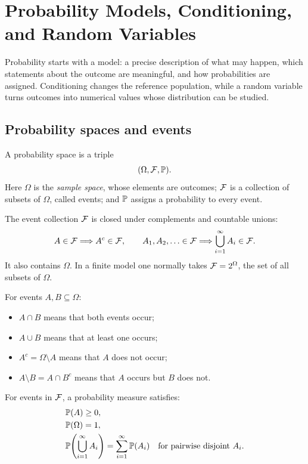 \chapter{Probability Models, Conditioning, and Random Variables}
\label{chap:probability-models}

Probability starts with a model: a precise description of what may happen,
which statements about the outcome are meaningful, and how probabilities are
assigned. Conditioning changes the reference population, while a random
variable turns outcomes into numerical values whose distribution can be
studied.

\section{Probability spaces and events}

\begin{definition}
A probability space is a triple
\[
  (\Omega,\mathcal{F},\mathbb{P}).
\]
Here \(\Omega\) is the \emph{sample space}, whose elements are outcomes;
\(\mathcal{F}\) is a collection of subsets of \(\Omega\), called events; and
\(\mathbb{P}\) assigns a probability to every event.
\end{definition}

The event collection \(\mathcal{F}\) is closed under complements and countable
unions:
\[
  A\in\mathcal{F} \Longrightarrow A^c\in\mathcal{F},
  \qquad
  A_1,A_2,\ldots\in\mathcal{F}
  \Longrightarrow \bigcup_{i=1}^{\infty}A_i\in\mathcal{F}.
\]
It also contains \(\Omega\). In a finite model one normally takes
\(\mathcal{F}=2^\Omega\), the set of all subsets of \(\Omega\).

For events \(A,B\subseteq\Omega\):
\begin{itemize}
  \item \(A\cap B\) means that both events occur;
  \item \(A\cup B\) means that at least one occurs;
  \item \(A^c=\Omega\setminus A\) means that \(A\) does not occur;
  \item \(A\setminus B=A\cap B^c\) means that \(A\) occurs but \(B\) does not.
\end{itemize}

\begin{definition}
For events in \(\mathcal{F}\), a probability measure satisfies:
\begin{align*}
  &\mathbb{P}(A)\ge 0,\\
  &\mathbb{P}(\Omega)=1,\\
  &\mathbb{P}\!\left(\bigcup_{i=1}^{\infty}A_i\right)
    =\sum_{i=1}^{\infty}\mathbb{P}(A_i)
    \quad\text{for pairwise disjoint }A_i.
\end{align*}
\end{definition}

